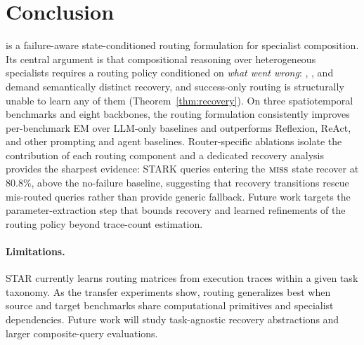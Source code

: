 \section{Conclusion}
\label{sec:conclusion}

\starname{} is a failure-aware state-conditioned routing formulation for specialist composition.
Its central argument is that compositional reasoning over heterogeneous specialists requires a routing policy conditioned on \emph{what went wrong}: \sfail, \sblock, and \smiss demand semantically distinct recovery, and success-only routing is structurally unable to learn any of them (Theorem~\ref{thm:recovery}).
On three spatiotemporal benchmarks and eight backbones, the routing formulation consistently improves per-benchmark EM over LLM-only baselines and outperforms Reflexion, ReAct, and other prompting and agent baselines.
Router-specific ablations isolate the contribution of each routing component and a dedicated recovery analysis provides the sharpest evidence: STARK queries entering the $\textnormal{\textsc{miss}}$ state recover at 80.8\%, above the no-failure baseline, suggesting that recovery transitions rescue mis-routed queries rather than provide generic fallback.
Future work targets the parameter-extraction step that bounds \sfail{} recovery and learned refinements of the routing policy beyond trace-count estimation.

\paragraph{Limitations.}
STAR currently learns routing matrices from execution traces within a given task taxonomy.
As the transfer experiments show, routing generalizes best when source and target benchmarks share computational primitives and specialist dependencies.
Future work will study task-agnostic recovery abstractions and larger composite-query evaluations.
